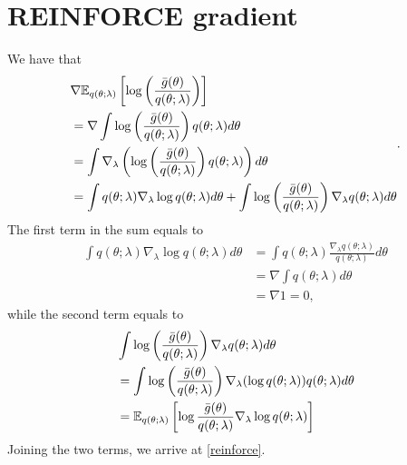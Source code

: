 \chapter{REINFORCE gradient}
We have that
\begin{equation}
\begin{split}
& \nabla {\mathbb E}_{q(\theta;\lambda)}\left[\log \left(\frac{{\bar{g}}(\theta)}{q(\theta;\lambda)}\right)\right] \\& = \nabla \int \log \left(\frac{{\bar{g}}(\theta)}{q(\theta;\lambda)}\right) q(\theta;\lambda) d\theta \\
& = \int \nabla_\lambda \left( \log \left( \frac{{\bar{g}}(\theta)}{q(\theta;\lambda)}\right) q(\theta;\lambda) \right) d\theta \\
& = \int q(\theta;\lambda) \nabla_\lambda \log q(\theta;\lambda) d\theta + \int \log \left( \frac{{\bar{g}}(\theta)}{q(\theta;\lambda)}\right) \nabla_\lambda q(\theta;\lambda) d\theta
\end{split}.
\end{equation}
The first term in the sum equals to
\begin{equation}
\begin{split}
\int q(\theta;\lambda) \nabla_\lambda \log q(\theta;\lambda) d\theta & = \int q(\theta;\lambda) \frac{\nabla_\lambda q(\theta;\lambda)}{q(\theta;\lambda)} d\theta \\
& = \nabla \int q(\theta;\lambda) d\theta \\
& = \nabla 1 = 0,
\end{split}
\end{equation}
while the second term equals to
\begin{equation}
\begin{split}
& \int \log \left( \frac{{\bar{g}}(\theta)}{q(\theta;\lambda)}\right) \nabla_\lambda q(\theta;\lambda) d\theta \\ & = \int \log \left( \frac{{\bar{g}}(\theta)}{q(\theta;\lambda)}\right) \nabla_\lambda ( \log q(\theta;\lambda)) q(\theta;\lambda) d\theta \\
& = {\mathbb E}_{q(\theta;\lambda)} \left[ \log \frac{{\bar{g}}(\theta)}{q(\theta;\lambda)} \nabla_{\lambda} \log q(\theta;\lambda) \right]
\end{split}
\end{equation}
Joining the two terms, we arrive at \eqref{reinforce}.
